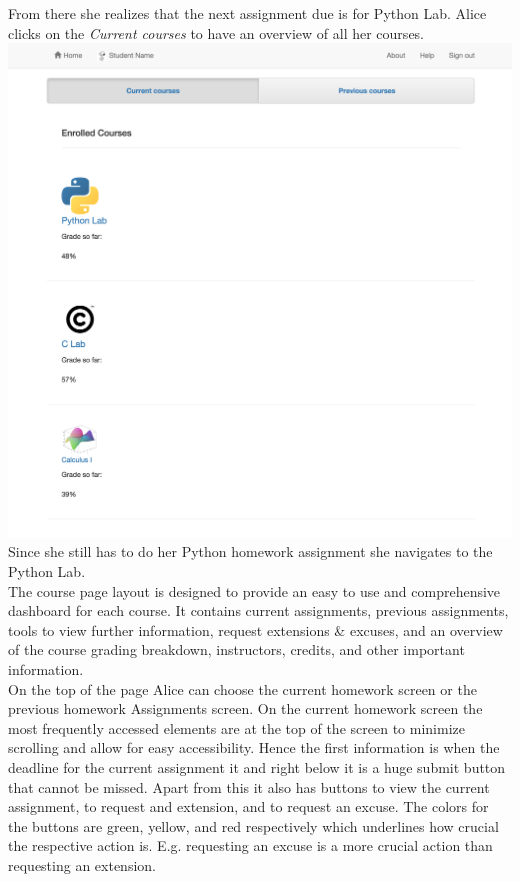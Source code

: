 From there she realizes that the next assignment due is for Python Lab. Alice clicks on the \textit{Current courses} to have an overview of all her courses.\\
\includegraphics{screenshots/CurrentCourses}\\
Since she still has to do her Python homework assignment she navigates to the Python Lab.\\
The course page layout is designed to provide an easy to use and comprehensive dashboard for each course. It contains current assignments, previous assignments, tools to view further information, request extensions \& excuses, and an overview of the course grading breakdown, instructors, credits, and other important information.\\

On the top of the page Alice can choose the current homework screen or the previous homework Assignments screen. On the current homework screen the most frequently accessed elements are at the top of the screen to minimize scrolling and allow for easy accessibility. Hence the first information is when the deadline for the current assignment it and right below it is a huge submit button that cannot be missed. Apart from this it also has buttons to view the current assignment, to request and extension, and to request an excuse. The colors for the buttons are green, yellow, and red respectively which underlines how crucial the respective action is. E.g. requesting an excuse is a more crucial action than requesting an extension.\\

